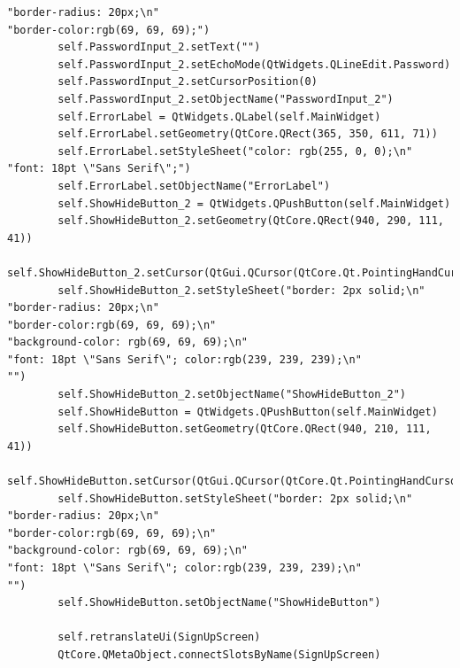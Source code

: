 \documentclass[12pt]{article}
\begin{document}
\begin{lstlisting}
"border-radius: 20px;\n"
"border-color:rgb(69, 69, 69);")
        self.PasswordInput_2.setText("")
        self.PasswordInput_2.setEchoMode(QtWidgets.QLineEdit.Password)
        self.PasswordInput_2.setCursorPosition(0)
        self.PasswordInput_2.setObjectName("PasswordInput_2")
        self.ErrorLabel = QtWidgets.QLabel(self.MainWidget)
        self.ErrorLabel.setGeometry(QtCore.QRect(365, 350, 611, 71))
        self.ErrorLabel.setStyleSheet("color: rgb(255, 0, 0);\n"
"font: 18pt \"Sans Serif\";")
        self.ErrorLabel.setObjectName("ErrorLabel")
        self.ShowHideButton_2 = QtWidgets.QPushButton(self.MainWidget)
        self.ShowHideButton_2.setGeometry(QtCore.QRect(940, 290, 111, 41))
        self.ShowHideButton_2.setCursor(QtGui.QCursor(QtCore.Qt.PointingHandCursor))
        self.ShowHideButton_2.setStyleSheet("border: 2px solid;\n"
"border-radius: 20px;\n"
"border-color:rgb(69, 69, 69);\n"
"background-color: rgb(69, 69, 69);\n"
"font: 18pt \"Sans Serif\"; color:rgb(239, 239, 239);\n"
"")
        self.ShowHideButton_2.setObjectName("ShowHideButton_2")
        self.ShowHideButton = QtWidgets.QPushButton(self.MainWidget)
        self.ShowHideButton.setGeometry(QtCore.QRect(940, 210, 111, 41))
        self.ShowHideButton.setCursor(QtGui.QCursor(QtCore.Qt.PointingHandCursor))
        self.ShowHideButton.setStyleSheet("border: 2px solid;\n"
"border-radius: 20px;\n"
"border-color:rgb(69, 69, 69);\n"
"background-color: rgb(69, 69, 69);\n"
"font: 18pt \"Sans Serif\"; color:rgb(239, 239, 239);\n"
"")
        self.ShowHideButton.setObjectName("ShowHideButton")

        self.retranslateUi(SignUpScreen)
        QtCore.QMetaObject.connectSlotsByName(SignUpScreen)


\end{lstlisting}
\end{document}
